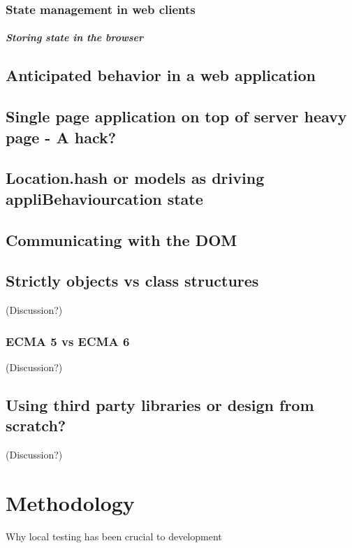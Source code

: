 \documentclass[english]{ifimaster}
\begin{document}
\subsection{State management in web clients}
\paragraph{Storing state in the browser}

\section{Anticipated behavior in a web application}

\section{Single page application on top of server heavy page - A hack?}



\section{Location.hash or models as driving appliBehaviourcation state}

\section{Communicating with the DOM}

\section{Strictly objects vs class structures} (Discussion?)
\subsection{ECMA 5 vs ECMA 6} (Discussion?)

\section{Using third party libraries or design from scratch?} (Discussion?)

\chapter{Methodology}
Why local testing has been crucial to development 
\end{document}
